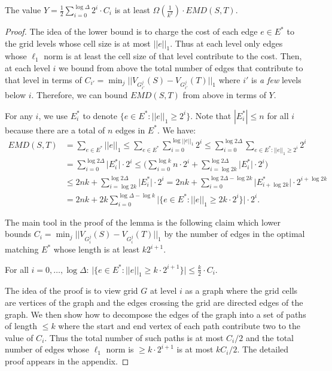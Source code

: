 \documentclass[oribibl]{llncs}
\begin{document}
\begin{lemma}\label{lowerbound}
The value $Y = \frac{1}{2}\sum_{i = 0}^{\log\Delta}2^i\cdot C_i$
is at least $\displaystyle\Omega(\frac{1}{k^2})\cdot EMD(S,T)$.
\end{lemma}
\begin{proof}
The idea of the lower bound is to charge the cost of each edge $e\in E^*$ to
the grid levels whose cell size is at most $||e||_1$. Thus at each level
only edges whose $\ell_1$ norm is at least the cell size of
that level contribute to the cost.
Then, at each level $i$ we bound from above the total number of
edges that contribute to that level in terms of
$C_{i'}=\min_j||V_{G^j_{i'}}(S) - V_{G^j_{i'}}(T)||_1$ where $i'$ is
\textit{a few} levels below $i$. Therefore, we can bound $EMD(S,T)$
from above in terms of $Y$.

For any $i$, we use $E^*_i$ to denote $\{e \in E^* : ||e||_1 \ge 2^i \}$. 
Note that $|E^*_i|\le n$ for all $i$ because there are a total of
$n$ edges in $E^*$.
We have:
\begin{align}
 EMD(S,T) &= \sum_{e\in E^*}||e||_1 \le \sum_{e\in E^*}\sum_{i = 0}^{\log||e||_1}2^i
          \le \sum_{i=0}^{\log 2\Delta}\sum_{e\in E^*: ||e||_1\ge 2^i} 2^i\nonumber\\
          & = \sum_{i=0}^{\log 2\Delta}\big|E^*_i\big|\cdot2^i
          \le \Bigg(\sum_{i= 0}^{\log k}n\cdot2^i + \sum_{i=\log 2k}^{\log 2\Delta}\big|E^*_i\big|\cdot2^i\Bigg)&\nonumber\\
          &\le 2nk + \sum_{i=\log 2k}^{\log 2\Delta}\big|E^*_i\big|\cdot2^i
          = 2nk + \sum_{i=0}^{\log 2\Delta-\log 2k}\big|E^*_{i+\log 2k}\big|\cdot 2^{i+\log 2k}\nonumber\\
&= 2nk + 2k\sum_{i=0}^{\log \Delta-\log k}\Big|\{e\in E^*: ||e||_1\ge 2k\cdot 2^{i}\}\Big|\cdot2^{i}\label{eq3}.
\end{align}

The main tool in the proof of the lemma is the following claim which lower
bounds $C_{i} = \min_j||V_{G^j_{i}}(S) - V_{G^j_{i}}(T)||_1$
by the number of edges in the optimal matching $E^*$ whose length is at least
$k2^{i+1}$.
 
\begin{myclaim}\label{cl2}
 For all $i = 0, \ldots, \log\Delta$:
$\Big|\{e\in E^*: ||e||_1\ge k\cdot2^{i+1}\}\Big| \le \frac{k}{2}\cdot C_{i}$.
\end{myclaim}
The idea of the proof is to view grid $G$ at level $i$ as a graph where the
grid cells are vertices of the graph and the edges crossing the grid are
directed edges of the graph. We then show how to decompose the edges of the
graph into a set of paths of length $\le k$ where the start and end vertex of
each path contribute two to the value of $C_i$. Thus the total number of
such paths is at most $C_i/2$ and the total number of edges whose $\ell_1$
norm is $\ge k\cdot2^{i+1}$ is at most $kC_i/2$. The detailed proof appears in
the appendix.


\end{proof}
\end{document}
